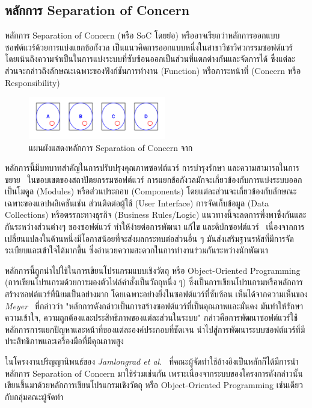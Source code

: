 \documentclass[12pt,one side,openright,a4paper]{cpe-thesis-th}
\newcommand{\thaijustify}[1]{%
  \par\hspace{30pt}\justifying
  #1
}
\begin{document}
    \subsection{หลักการ Separation of Concern}
        \thaijustify{
            หลักการ Separation of Concern (หรือ SoC โดยย่อ) หรืออาจเรียกว่าหลักการออกแบบซอฟต์แวร์ด้วยการแบ่งแยกข้อกังวล เป็นแนวคิดการออกแบบหนึ่งในสาขาวิชาวิศวกรรมซอฟต์แวร์ โดยเน้นถึงความจำเป็นในการแบ่งระบบที่ซับซ้อนออกเป็นส่วนที่แตกต่างกันและจัดการได้ ซึ่งแต่ละส่วนจะกล่าวถึงลักษณะเฉพาะของฟังก์ชันการทำงาน (Function) หรือภาระหน้าที่ (Concern หรือ Responsibility)~\cite{nattawat20pgs}
        }
        \begin{figure}[H]
            \centering
            \includegraphics[width=6cm]{figure/literature/soc.png}
            \caption[แผนผังแสดงหลักการ Separation of Concern]{แผนผังแสดงหลักการ Separation of Concern จาก~\cite{wikipedia04soc}}
            \label{fig:soc-general}
        \end{figure}
        \thaijustify{
            หลักการนี้มีบทบาทสำคัญในการปรับปรุงคุณภาพซอฟต์แวร์ การบำรุงรักษา และความสามารถในการขยาย~\cite{dijkstra82} ในขอบเขตของสถาปัตยกรรมซอฟต์แวร์ การแยกข้อกังวลมักจะเกี่ยวข้องกับการแบ่งระบบออกเป็นโมดูล (Modules) หรือส่วนประกอบ (Components) โดยแต่ละส่วนจะเกี่ยวข้องกับลักษณะเฉพาะของแอปพลิเคชันเช่น ส่วนติดต่อผู้ใช้ (User Interface) การจัดเก็บข้อมูล (Data Collections) หรือตรรกะทางธุรกิจ (Business Rules/Logic) แนวทางนี้จะลดการพึ่งพาซึ่งกันและกันระหว่างส่วนต่างๆ ของซอฟต์แวร์ ทำให้ง่ายต่อการพัฒนา แก้ไข และดีบักซอฟต์แวร์~\cite{wikipedia04soc} เนื่องจากการเปลี่ยนแปลงในด้านหนึ่งมีโอกาสน้อยที่จะส่งผลกระทบต่อส่วนอื่น ๆ มันส่งเสริมฐานรหัสที่มีการจัดระเบียบและเข้าใจได้มากขึ้น ซึ่งอำนวยความสะดวกในการทำงานร่วมกันระหว่างนักพัฒนา
        }
        \thaijustify{
            หลักการนี้ถูกนำไปใช้ในการเขียนโปรแกรมแบบเชิงวัตถุ หรือ Object-Oriented Programming (การเขียนโปรแกรมด้วยการมองตัวไฟล์คำสั่งเป็นวัตถุหนึ่ง ๆ) ซึ่งเป็นการเขียนโปรแกรมหรือหลักการสร้างซอฟต์แวร์ที่นิยมเป็นอย่างมาก โดยเฉพาะอย่างยิ่งในซอฟต์แวร์ที่ซับซ้อน เห็นได้จากความเห็นของ \textit{Meyer}~\cite{meyer2000} ที่กล่าวว่า "หลักการดังกล่าวเป็นการสร้างซอฟต์แวร์ที่เป็นคุณภาพและมั่นคง มันทำให้รักษาความเข้าใจ, ความถูกต้องและประสิทธิภาพของแต่ละส่วนในระบบ" กล่าวคือการพัฒนาซอฟต์แวร์ใช้หลักการการแยกปัญหาและหน้าที่ของแต่ละองค์ประกอบที่ชัดเจน นำไปสู่การพัฒนาระบบซอฟต์แวร์ที่มีประสิทธิภาพและเครื่องมือที่มีคุณภาพสูง
        }
        \thaijustify{
            ในโครงงานปริญญานิพนธ์ของ \textit{Jamlongrad et al.}~\cite{nattawat20pgs} ที่คณะผู้จัดทำใช้อ้างอิงเป็นหลักก็ได้มีการนำหลักการ Separation of Concern มาใช้ร่วมเช่นกัน เพราะเนื่องจากระบบของโครงการดังกล่าวนั้น เขียนขึ้นมาด้วยหลักการเขียนโปรแกรมเชิงวัตถุ หรือ Object-Oriented Programming เช่นเดียวกับกลุ่มคณะผู้จัดทำ
        }
\end{document}
